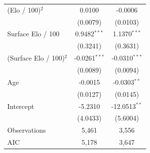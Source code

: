 \begin{tabular}{lcc}
(Elo / 100)$^2$ & 0.0100 & -0.0006 \\
 & (0.0079) & (0.0103) \\
Surface Elo / 100 & 0.9482$^{***}$ & 1.1370$^{***}$ \\
 & (0.3241) & (0.3631) \\
(Surface Elo / 100)$^2$ & -0.0261$^{***}$ & -0.0310$^{***}$ \\
 & (0.0089) & (0.0094) \\
Age & -0.0015 & -0.0303$^{**}$ \\
 & (0.0127) & (0.0145) \\
Intercept & -5.2310 & -12.0513$^{**}$ \\
 & (4.0433) & (5.6004) \\
\midrule
Observations & 5,461 & 3,556 \\
AIC & 5,178 & 3,647 \\
\bottomrule
\end{tabular}
